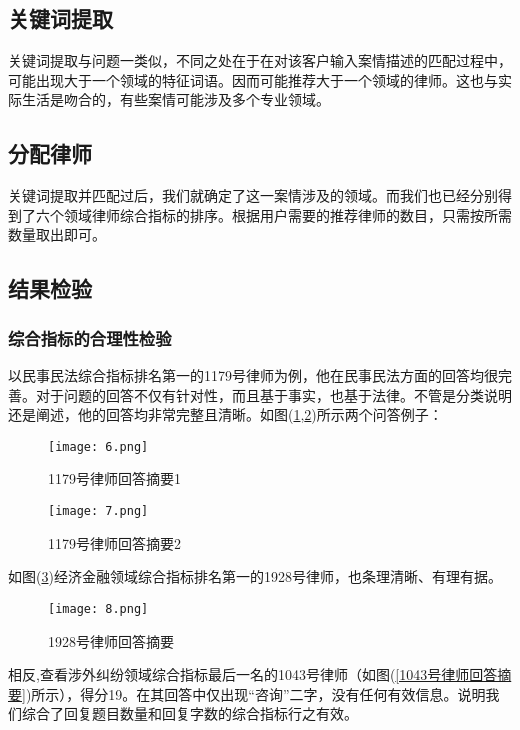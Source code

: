 \documentclass[bwprint]{cumcmthesis}
\begin{document}
\subsection{关键词提取}

关键词提取与问题一类似，不同之处在于在对该客户输入案情描述的匹配过程中，可能出现大于一个领域的特征词语。因而可能推荐大于一个领域的律师。这也与实际生活是吻合的，有些案情可能涉及多个专业领域。

\subsection{分配律师}

关键词提取并匹配过后，我们就确定了这一案情涉及的领域。而我们也已经分别得到了六个领域律师综合指标的排序。根据用户需要的推荐律师的数目，只需按所需数量取出即可。

\subsection{结果检验}

\subsubsection*{综合指标的合理性检验}


以民事民法综合指标排名第一的1179号律师为例，他在民事民法方面的回答均很完善。对于问题的回答不仅有针对性，而且基于事实，也基于法律。不管是分类说明还是阐述，他的回答均非常完整且清晰。如图(\ref{1179号律师回答摘要1},\ref{1179号律师回答摘要2})所示两个问答例子：

\begin{figure}[!htp]
\centering
\texttt{[image: 6.png]}
\caption{1179号律师回答摘要1}
\label{1179号律师回答摘要1}
\end{figure}

\begin{figure}[!htp]
\centering
\texttt{[image: 7.png]}
\caption{1179号律师回答摘要2}
\label{1179号律师回答摘要2}
\end{figure}


如图(\ref{1928号律师回答摘要})经济金融领域综合指标排名第一的1928号律师，也条理清晰、有理有据。

\begin{figure}[!htp]
\centering
\texttt{[image: 8.png]}
\caption{1928号律师回答摘要}
\label{1928号律师回答摘要}
\end{figure}

相反,查看涉外纠纷领域综合指标最后一名的1043号律师（如图(\ref{1043号律师回答摘要})所示），得分19。在其回答中仅出现“咨询”二字，没有任何有效信息。说明我们综合了回复题目数量和回复字数的综合指标行之有效。
\end{document}
